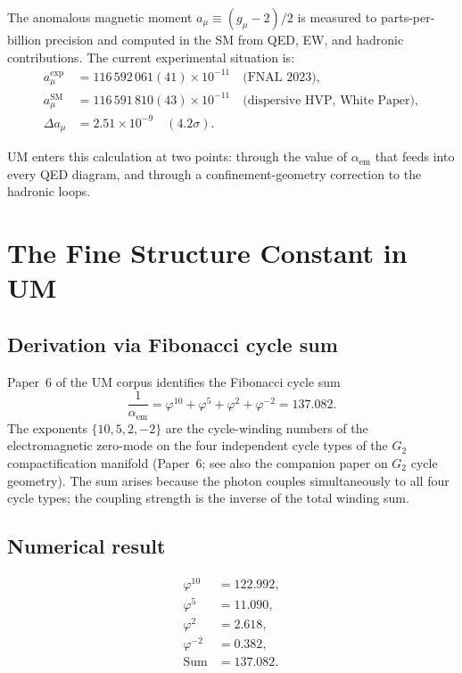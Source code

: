 \documentclass[12pt]{article}
\begin{document}
The anomalous magnetic moment $a_\mu \equiv (g_\mu - 2)/2$ is measured
to parts-per-billion precision and computed in the SM from QED, EW, and
hadronic contributions. The current experimental situation is:
\begin{align}
  a_\mu^{\text{exp}}  &= 116\,592\,061(41) \times 10^{-11}
    \quad \text{(FNAL 2023)}, \\
  a_\mu^{\text{SM}}   &= 116\,591\,810(43) \times 10^{-11}
    \quad \text{(dispersive HVP, White Paper)}, \\
  \Delta a_\mu        &= 2.51 \times 10^{-9}
    \quad (4.2\sigma).
\end{align}

UM enters this calculation at two points: through the value of
$\alpha_{\text{em}}$ that feeds into every QED diagram, and through
a confinement-geometry correction to the hadronic loops.

\section{The Fine Structure Constant in UM}

\subsection{Derivation via Fibonacci cycle sum}

Paper~6 of the UM corpus identifies the Fibonacci cycle sum
\begin{equation}
  \frac{1}{\alpha_{\text{em}}}
  = \varphi^{10} + \varphi^5 + \varphi^2 + \varphi^{-2}
  = 137.082.
  \label{eq:fib}
\end{equation}
The exponents $\{10, 5, 2, -2\}$ are the cycle-winding numbers of the
electromagnetic zero-mode on the four independent cycle types of the
$G_2$ compactification manifold (Paper~6; see also the companion paper
on $G_2$ cycle geometry). The sum arises because the photon couples
simultaneously to all four cycle types; the coupling strength is the
inverse of the total winding sum.

\subsection{Numerical result}

\begin{align}
  \varphi^{10} &= 122.992,\\
  \varphi^5    &= 11.090,\\
  \varphi^2    &= 2.618,\\
  \varphi^{-2} &= 0.382,\\
  \text{Sum}   &= 137.082.
\end{align}
\end{document}
